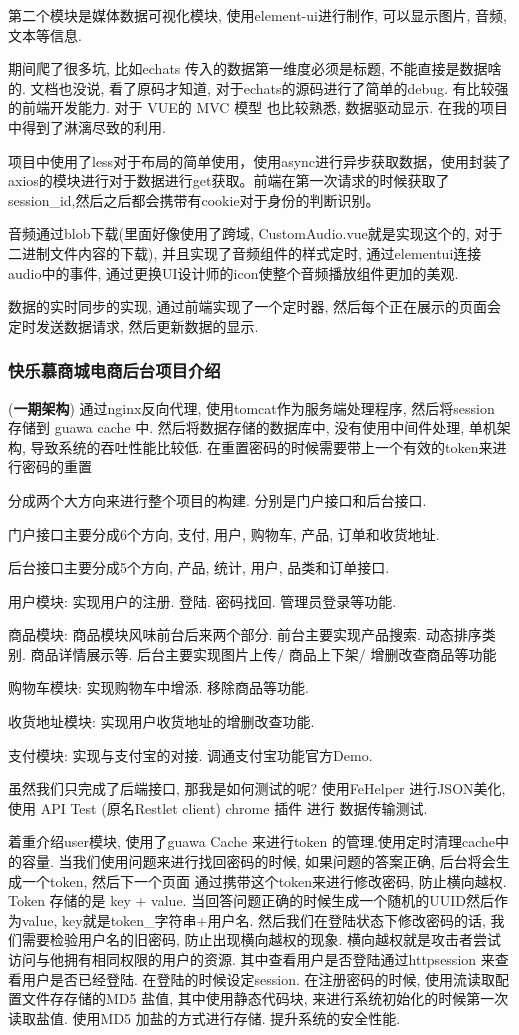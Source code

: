 第二个模块是媒体数据可视化模块, 使用element-ui进行制作, 可以显示图片, 音频, 文本等信息.

期间爬了很多坑, 比如echats 传入的数据第一维度必须是标题, 不能直接是数据啥的. 文档也没说, 看了原码才知道, 对于echats的源码进行了简单的debug. 有比较强的前端开发能力. 对于 VUE的  MVC 模型 也比较熟悉, 数据驱动显示. 在我的项目中得到了淋漓尽致的利用.

项目中使用了less对于布局的简单使用，使用async进行异步获取数据，使用封装了axios的模块进行对于数据进行get获取。前端在第一次请求的时候获取了session\_id,然后之后都会携带有cookie对于身份的判断识别。

音频通过blob下载(里面好像使用了跨域, CustomAudio.vue就是实现这个的, 对于二进制文件内容的下载), 并且实现了音频组件的样式定时, 通过elementui连接audio中的事件,  通过更换UI设计师的icon使整个音频播放组件更加的美观.

数据的实时同步的实现, 通过前端实现了一个定时器, 然后每个正在展示的页面会定时发送数据请求, 然后更新数据的显示.
\subsubsection{快乐慕商城电商后台项目介绍}
(\textbf{一期架构}) 通过nginx反向代理, 使用tomcat作为服务端处理程序, 然后将session 存储到 guawa cache 中. 然后将数据存储的数据库中, 没有使用中间件处理, 单机架构, 导致系统的吞吐性能比较低. 在重置密码的时候需要带上一个有效的token来进行密码的重置

分成两个大方向来进行整个项目的构建. 分别是门户接口和后台接口.

门户接口主要分成6个方向, 支付, 用户, 购物车, 产品, 订单和收货地址.

后台接口主要分成5个方向, 产品, 统计, 用户, 品类和订单接口.

用户模块: 实现用户的注册. 登陆. 密码找回. 管理员登录等功能.

商品模块: 商品模块风味前台后来两个部分. 前台主要实现产品搜索. 动态排序类别. 商品详情展示等. 后台主要实现图片上传/ 商品上下架/ 增删改查商品等功能

购物车模块: 实现购物车中增添. 移除商品等功能.

收货地址模块: 实现用户收货地址的增删改查功能.

支付模块: 实现与支付宝的对接. 调通支付宝功能官方Demo.

虽然我们只完成了后端接口, 那我是如何测试的呢?  使用FeHelper 进行JSON美化, 使用 API Test (原名Restlet client) chrome 插件 进行 数据传输测试.

着重介绍user模块, 使用了guawa Cache 来进行token 的管理.使用定时清理cache中的容量.
当我们使用问题来进行找回密码的时候, 如果问题的答案正确, 后台将会生成一个token, 然后下一个页面 通过携带这个token来进行修改密码, 防止横向越权. Token 存储的是 key + value. 当回答问题正确的时候生成一个随机的UUID然后作为value, key就是token\_字符串+用户名. 然后我们在登陆状态下修改密码的话, 我们需要检验用户名的旧密码, 防止出现横向越权的现象. 横向越权就是攻击者尝试访问与他拥有相同权限的用户的资源. 其中查看用户是否登陆通过httpsession 来查看用户是否已经登陆.  在登陆的时候设定session. 在注册密码的时候, 使用流读取配置文件存存储的MD5 盐值, 其中使用静态代码块, 来进行系统初始化的时候第一次读取盐值. 使用MD5 加盐的方式进行存储.    提升系统的安全性能.





